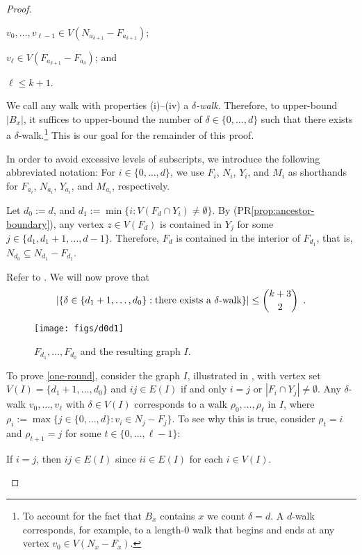 \documentclass{patmorin}
\renewcommand{\propref}[1]{(PR\ref{prop:#1})}
\begin{document}
\begin{proof}
\begin{compactenum}[(i)]
    \item $v_0,\ldots,v_{\ell-1}\in V(N_{a_{\delta+1}}-F_{a_{\delta+1}})$;
    
    \item $v_\ell\in V(F_{a_{\delta+1}}-F_{a_\delta})$; and
    
    \item $\ell\le k+1$.
  \end{compactenum}
  We call any walk with properties (i)--(iv) a \emph{$\delta$-walk}. Therefore, to upper-bound $|B_x|$, it suffices to upper-bound the number of $\delta\in\{0,\ldots,d\}$ such that there exists a $\delta$-walk.\footnote{To account for the fact that $B_x$ contains $x$ we count $\delta=d$.  A $d$-walk corresponds, for example, to a length-0 walk that begins and ends at any vertex $v_0\in V(N_x-F_x)$.}  This is our goal for the remainder of this proof. 
  
  In order to avoid excessive levels of subscripts, we introduce the following abbreviated notation: For $i\in\{0,\ldots,d\}$, we use $F_i$, $N_i$, $Y_i$, and $M_i$ as shorthands for $F_{a_i}$, $N_{a_i}$, $Y_{a_i}$, and $M_{a_i}$, respectively.
  
  Let $d_0:=d$, and $d_1:=\min\{i: V(F_d\cap Y_i)\neq\emptyset \}$.  By \propref{ancestor-boundary}, any vertex $z\in V(F_d)$ is contained in 
  $Y_j$ for some $j\in \{d_1,d_1+1,\ldots,d-1\}$.  Therefore, $F_d$ is contained in the interior of  $F_{d_1}$, that is, $N_{d_0}\subseteq N_{d_1}-F_{d_1}$.   
  
  Refer to .  We will now prove that 
  \begin{equation}
     |\{\delta\in\{d_1+1,\ldots,d_0\}:  \mbox{there exists a $\delta$-walk} \}| \le \binom{k+3}{2} \enspace . \eqlabel{one-round}
  \end{equation}
  \begin{figure}
    \begin{center}
      \texttt{[image: figs/d0d1]}
    \end{center}
    \caption{$F_{d_1},\ldots,F_{d_0}$ and the resulting graph $I$.} 
  \end{figure}
  
  To prove \eqref{one-round}, consider the graph $I$, illustrated in , with vertex set $V(I)=\{d_1+1,\ldots,d_0\}$ and $ij\in E(I)$ if and only $i=j$ or $|F_i\cap Y_j|\neq\emptyset$.  Any $\delta$-walk $v_0,\ldots,v_\ell$ with $\delta\in V(I)$ corresponds to a walk $\rho_0,\ldots,\rho_{\ell}$ in $I$, where $\rho_i:=\max\{j\in\{0,\ldots,d\} : v_i\in N_{j}-F_j\}$.  To see why this is true, consider $\rho_{t}= i$ and $\rho_{t+1}=j$ for some $t\in\{0,\ldots,\ell-1\}$:
  \begin{compactenum}
    \item If $i=j$, then $ij\in E(I)$ since $ii\in E(I)$ for each $i\in V(I)$.
    

\end{compactenum}
\end{proof}
\end{document}
